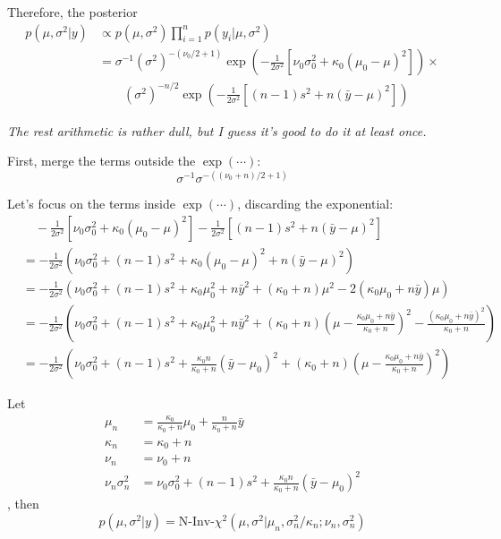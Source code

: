 \documentclass{article}
\begin{document}
\begin{itemize}
Therefore, the posterior 
\begin{align*}
p(\mu, \sigma^2 | y) &\propto  p(\mu, \sigma^2) \prod_{i=1}^n p(y_i | \mu, \sigma^2) \\
	&= \sigma^{-1} (\sigma^2)^{-(\nu_0/2 + 1)} \exp \left (-\frac{1}{2\sigma^2} [\nu_0 \sigma_0^2 + \kappa_0 (\mu_0 - \mu)^2] \right) \times \\
	& \qquad (\sigma^2)^{-n/2} \exp \left ( -\frac{1}{2\sigma^2}[(n-1)s^2 + n (\bar y - \mu)^2] \right )
\end{align*}

\textit{The rest arithmetic is rather dull, but I guess it's good to do it at least once.}

First, merge the terms outside the $\exp(\cdots)$:
$$
\sigma^{-1} \sigma^{-\left( (\nu_0 + n)/ 2 + 1 \right)}
$$

Let's focus on the terms inside $\exp (\cdots)$, discarding the exponential:
\begin{align*}
&\quad -\frac{1}{2\sigma^2} [\nu_0 \sigma_0^2 + \kappa_0 (\mu_0 - \mu)^2] -\frac{1}{2\sigma^2}[(n-1)s^2 + n (\bar y - \mu)^2] \\
&= -\frac{1}{2\sigma^2} \left ( \nu_0\sigma_0^2 + (n-1)s^2 + \kappa_0 (\mu_0 - \mu)^2 + n (\bar y - \mu)^2 \right) \\
&= -\frac{1}{2\sigma^2} \left ( \nu_0\sigma_0^2 + (n-1)s^2  + \kappa_0 \mu_0^2 + n {\bar y}^2 + (\kappa_0 + n) \mu^2 - 2(\kappa_0 \mu_0 + n \bar y) \mu \right ) \\
&= -\frac{1}{2\sigma^2} \left ( \nu_0\sigma_0^2 + (n-1)s^2  + \kappa_0 \mu_0^2 + n {\bar y}^2 + (\kappa_0 + n) \left( \mu - \frac{\kappa_0 \mu_0 + n \bar y}{\kappa_0 + n} \right) ^2  - \frac{(\kappa_0 \mu_0 + n \bar y)^2}{\kappa_0 + n}\right ) \\
&= -\frac{1}{2\sigma^2} \left ( \nu_0\sigma_0^2 + (n-1)s^2  + \frac{\kappa_0 n}{\kappa_0 + n} (\bar y - \mu_0)^2  +  (\kappa_0 + n) \left( \mu - \frac{\kappa_0 \mu_0 + n \bar y}{\kappa_0 + n} \right) ^2 \right)
\end{align*}

Let 
\begin{align*}
\mu_n &= \frac{\kappa_0}{\kappa_0 + n} \mu_0 + \frac{n}{\kappa_0 + n} \bar y  \\
\kappa_n &= \kappa_0 + n \\
\nu_n &= \nu_0 + n \\
\nu_n \sigma_n^2 &= \nu_0\sigma_0^2 + (n-1)s^2  + \frac{\kappa_0 n}{\kappa_0 + n} (\bar y - \mu_0)^2
\end{align*}
, then
$$
p(\mu, \sigma^2 | y) = \text{N-Inv-} \chi^2 (\mu, \sigma^2 | \mu_n, \sigma_n^2 / \kappa_n; \nu_n, \sigma_n^2)
$$



\end{itemize}
\end{document}
